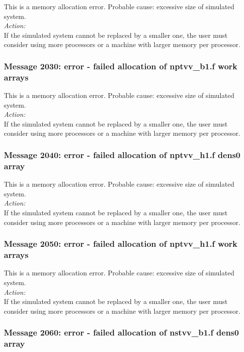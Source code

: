 This is a memory allocation error. Probable cause: excessive size of
simulated system. \\

\noindent
{\em Action:}\\
If the simulated system cannot be replaced by a smaller one, the user
must consider using more processors or a machine with larger memory
per processor.

\subsubsection*{Message 2030: error - failed allocation of nptvv\_b1.f
work arrays}

This is a memory allocation error. Probable cause: excessive size of
simulated system. \\

\noindent
{\em Action:}\\
If the simulated system cannot be replaced by a smaller one, the user
must consider using more processors or a machine with larger memory
per processor.

\subsubsection*{Message 2040: error - failed allocation of nptvv\_h1.f
dens0 array}

This is a memory allocation error. Probable cause: excessive size of
simulated system. \\

\noindent
{\em Action:}\\
If the simulated system cannot be replaced by a smaller one, the user
must consider using more processors or a machine with larger memory
per processor.

\subsubsection*{Message 2050: error - failed allocation of nptvv\_h1.f
work arrays}

This is a memory allocation error. Probable cause: excessive size of
simulated system. \\

\noindent
{\em Action:}\\
If the simulated system cannot be replaced by a smaller one, the user
must consider using more processors or a machine with larger memory
per processor.

\subsubsection*{Message 2060: error - failed allocation of nstvv\_b1.f
dens0 array}

